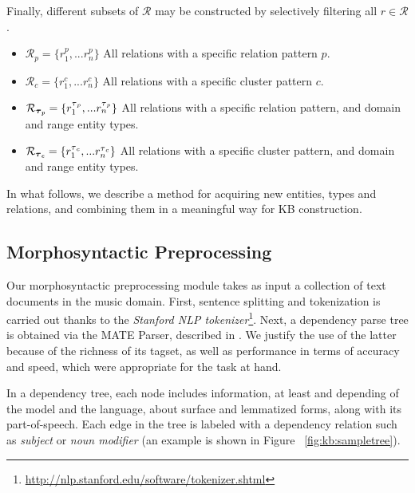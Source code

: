Finally, different subsets of $\mathcal{R}$ may be constructed by selectively filtering all $r \in \mathcal{R}$.  

\begin{itemize}
    \item $\mathcal{R}_{p} = \{r_1^p, ... r_n^p\}$ All relations with a specific relation pattern $p$.
    \item $\mathcal{R}_{c} = \{r_1^c, ... r_n^c\}$ All relations with a specific cluster pattern $c$.
    \item $\mathcal{R}_{\boldsymbol\tau{_\textbf{\textit{p}}}} = \{r_1^{\tau{_p}}, ... r_n^{\tau{_p}}\}$ All relations with a specific relation pattern, and domain and range entity types.
    \item $\mathcal{R}_{\boldsymbol\tau{_\textbf{\textit{c}}}} = \{r_1^{\tau{_c}}, ... r_n^{\tau{_c}}\}$ All relations with a specific cluster pattern, and domain and range entity types.
\end{itemize}

In what follows, we describe a method for acquiring new entities, types and relations, and combining them in a meaningful way for KB construction.


\subsection{Morphosyntactic Preprocessing}\label{sec:kb:method:preprocessing}

Our morphosyntactic preprocessing module takes as input a collection of text documents in the music domain. First, sentence splitting and tokenization is carried out thanks to the \textit{Stanford NLP tokenizer}\footnote{\url{http://nlp.stanford.edu/software/tokenizer.shtml}}. 
Next, a dependency parse tree is obtained via the MATE Parser, described in \cite{Bohnet2010}. We justify the use of the latter because of the richness of its tagset, as well as performance in terms of accuracy and speed, which were appropriate for the task at hand.

In a dependency tree, each node includes information, at least and depending of the model and the language, about surface and lemmatized forms, along with its part-of-speech. Each edge in the tree is labeled with a dependency relation such as \textit{subject} or \textit{noun modifier} (an example is shown in Figure ~\ref{fig:kb:sampletree}).


